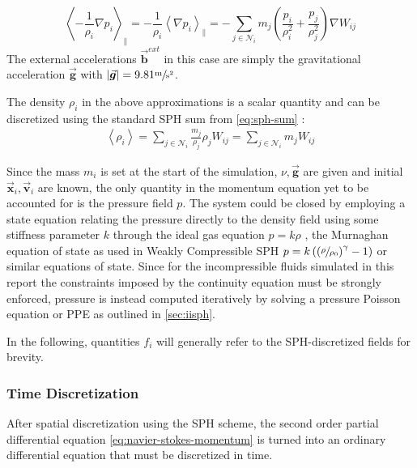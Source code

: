 \documentclass[oneside, a4paper]{book}
\newcommand\abs[1]{\left|#1\right|}
\newcommand\angled[1]{\left\langle#1\right\rangle}
\newcommand\vek[1]{\vec{\bm{#1}}}
\newcommand\br[1]{\left(#1\right)}
\begin{document}
    \begin{equation}\label{eq:discrete-pressure}
      \angled{-\frac{1}{\rho_i}\nabla p_i}_\parallel 
      = -\frac{1}{\rho_i}\angled{\nabla p_i}_\parallel 
      = -\sum_{j\in\mathcal{N}_i} m_j \br{\frac{p_i}{\rho_i^2} + \frac{p_j}{\rho_j^2}} \nabla W_{ij}
    \end{equation}
    The external accelerations $\vek{b}^{ext}$ in this case are simply the gravitational acceleration $\vek{g}$ with $\abs{\vek{g}}=9.81\sfrac{\si{\meter}}{\si{\second}^2}$. 

    The density $\rho_i$ in the above approximations is a scalar quantity and can be discretized using the standard SPH sum from \autoref{eq:sph-sum} \autocite{tutorial2019}:
    \begin{align}\label{eq:discrete-density}
      \angled{\rho_i}  
      = \sum_{j\in\mathcal{N}_i} \frac{m_j}{\rho_j} \rho_j W_{ij} 
      = \sum_{j\in\mathcal{N}_i} m_j W_{ij} 
    \end{align}

    Since the mass $m_i$ is set at the start of the simulation, $\nu,\vek{g}$ are given and initial $\vek{x}_i, \vek{v}_i$ are known, the only quantity in the momentum equation yet to be accounted for is the pressure field $p$. The system could be closed by employing a state equation relating the pressure directly to the density field using some stiffness parameter $k$ through the ideal gas equation $p=k\rho$ \autocite{müller-2003}, the Murnaghan equation of state \autocite{murnaghan-eos} as used in Weakly Compressible SPH \autocite{wcsph} $p=k\br{\br{\sfrac{\rho}{\rho_0}}^\gamma-1}$ or similar equations of state. Since for the incompressible fluids simulated in this report the constraints imposed by the continuity equation must be strongly enforced, pressure is instead computed iteratively by solving a pressure Poisson equation or PPE as outlined in \autoref{sec:iisph}.

    In the following, quantities $f_i$ will generally refer to the SPH-discretized fields for brevity.

    \subsubsection{Time Discretization}
    After spatial discretization using the SPH scheme, the second order partial differential equation \autoref{eq:navier-stokes-momentum} is turned into an ordinary differential equation \autocite{tutorial2019} that must be discretized in time. 
\end{document}
